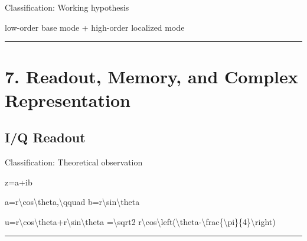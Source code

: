 \documentclass[
  a4paper]{article}
\newenvironment{Shaded}{}{}
\newcommand{\NormalTok}[1]{#1}
\begin{document}
Classification: Working hypothesis

\begin{Shaded}
\begin{Highlighting}[]
\NormalTok{low{-}order base mode}
\NormalTok{+ high{-}order localized mode}
\end{Highlighting}
\end{Shaded}

\begin{center}\rule{0.5\linewidth}{0.5pt}\end{center}

\section{7. Readout, Memory, and Complex
Representation}\label{readout-memory-and-complex-representation}

\subsection{I/Q Readout}\label{iq-readout}

Classification: Theoretical observation

\begin{Shaded}
\begin{Highlighting}[]
\NormalTok{z=a+ib}
\end{Highlighting}
\end{Shaded}

\begin{Shaded}
\begin{Highlighting}[]
\NormalTok{a=r\textbackslash{}cos\textbackslash{}theta,\textbackslash{}qquad b=r\textbackslash{}sin\textbackslash{}theta}
\end{Highlighting}
\end{Shaded}

\begin{Shaded}
\begin{Highlighting}[]
\NormalTok{u=r\textbackslash{}cos\textbackslash{}theta+r\textbackslash{}sin\textbackslash{}theta}
\NormalTok{=\textbackslash{}sqrt2 r\textbackslash{}cos\textbackslash{}left(\textbackslash{}theta{-}\textbackslash{}frac\{\textbackslash{}pi\}\{4\}\textbackslash{}right)}
\end{Highlighting}
\end{Shaded}

\begin{center}\rule{0.5\linewidth}{0.5pt}\end{center}
\end{document}
